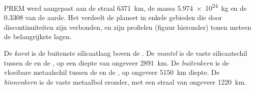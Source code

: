 PREM werd aangepast aan de straal \qty{6371}{km}, de massa \qty{5.974e24}{kg} en de  $0.3308$ van de aarde. Het verdeelt de planeet
in enkele gebieden die door discontinuïteiten zijn verbonden, en zijn profielen (figuur hieronder) tonen meteen de belangrijkste lagen.

\begin{definition}\label{def:b1:layered-earth:layers}
De \emph{korst} is de buitenste silicaatlaag boven de . De \emph{mantel} is de vaste silicaatschil tussen de  en de
, op een diepte van ongeveer \qty{2891}{km}. De \emph{buitenkern} is de vloeibare metaalschil tussen de 
en de , op ongeveer \qty{5150}{km} diepte. De \emph{binnenkern} is de vaste metaalbol eronder, met een straal van ongeveer
\qty{1220}{km}.
\end{definition}

